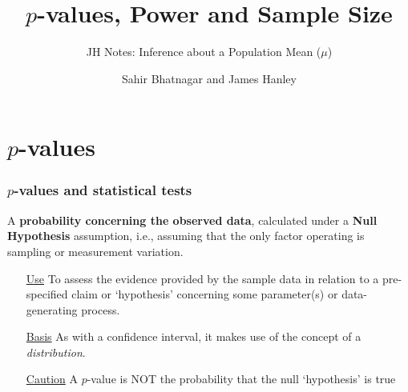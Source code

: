 \documentclass[handout]{beamer}\usepackage[]{graphicx}\usepackage[]{color}
\begin{document}




\title{$p$-values, Power and Sample Size}
\subtitle{JH Notes: Inference about a Population Mean ($\mu$)}
\author{Sahir Bhatnagar and James Hanley}


\maketitle

\section{$p$-values}
\begin{frame}
\frametitle{$p$-values and statistical tests}


\begin{defm}[$p$-value]
	A \textbf{probability concerning the observed data}, calculated under a \textbf{Null Hypothesis} assumption, i.e., assuming that the only factor operating is sampling or measurement variation. 
\end{defm}

\begin{itemize} 
	\item[\underline{Use}] To assess the evidence provided by the sample data
	in relation to a pre-specified claim or `hypothesis' concerning some parameter(s) or data-generating process. 
	\item[\underline{Basis}] As with a confidence interval, it makes use of the concept of a \textit{distribution}. 
	\item[\underline{Caution}] A $p$-value is NOT the probability that the null `hypothesis' is true
\end{itemize}
\end{frame}
\end{document}
